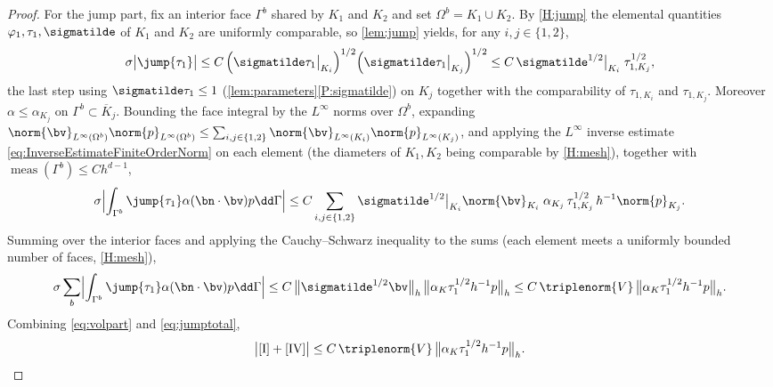 \begin{proof}
For the jump part, fix an interior face $\Gamma^b$ shared by $K_1$ and $K_2$ and set
$\Omega^b=K_1\cup K_2$. By \cref{H:jump} the elemental quantities
$\varphi_1,\tau_1,\sigmatilde$ of $K_1$ and $K_2$ are uniformly comparable, so
\cref{lem:jump} yields, for any $i,j\in\{1,2\}$,
\begin{equation}\label{eq:jumpsplit}
  \sigma\bigl|\jump{\tau_1}\bigr|
  \le C\,\Bigl(\sigmatilde\tau_1\big|_{K_i}\Bigr)^{1/2}
        \Bigl(\sigmatilde\tau_1\big|_{K_j}\Bigr)^{1/2}
  \le C\,\sigmatilde^{1/2}\big|_{K_i}\;\tau_{1,K_j}^{1/2},
\end{equation}
the last step using $\sigmatilde\tau_1\le1$ (\cref{lem:parameters}\ref{P:sigmatilde})
on $K_j$ together with the comparability of $\tau_{1,K_i}$ and $\tau_{1,K_j}$.
Moreover $\alpha\le\alpha_{K_j}$ on $\Gamma^b\subset\overline{K}_j$. Bounding the face
integral by the $L^\infty$ norms over $\Omega^b$, expanding
$\norm{\bv}_{L^\infty(\Omega^b)}\norm{p}_{L^\infty(\Omega^b)}
\le\sum_{i,j\in\{1,2\}}\norm{\bv}_{L^\infty(K_i)}\norm{p}_{L^\infty(K_j)}$, and applying
the $L^\infty$ inverse estimate \eqref{eq:InverseEstimateFiniteOrderNorm} on each element (the diameters of
$K_1,K_2$ being comparable by \cref{H:mesh}), together with
$\operatorname{meas}(\Gamma^b)\le C h^{d-1}$,
\begin{equation}\label{eq:jumppart}
  \sigma\Bigl|\int_{\Gamma^b}\jump{\tau_1}\alpha(\bn\cdot\bv)p\dd\Gamma\Bigr|
  \le C\sum_{i,j\in\{1,2\}}
  \sigmatilde^{1/2}\big|_{K_i}\norm{\bv}_{K_i}\;
  \alpha_{K_j}\,\tau_{1,K_j}^{1/2}\,h^{-1}\norm{p}_{K_j}.
\end{equation}
Summing over the interior faces and applying the Cauchy--Schwarz inequality to the sums
(each element meets a uniformly bounded number of faces, \cref{H:mesh}),
\begin{equation}\label{eq:jumptotal}
  \sigma\sum_{b}\Bigl|\int_{\Gamma^b}\jump{\tau_1}\alpha(\bn\cdot\bv)p
  \dd\Gamma\Bigr|
  \le C\,\bigl\lVert\sigmatilde^{1/2}\bv\bigr\rVert_h\,
  \bigl\lVert\alpha_K\tau_1^{1/2}h^{-1}p\bigr\rVert_h
  \le C\,\triplenorm{V}\,
  \bigl\lVert\alpha_K\tau_1^{1/2}h^{-1}p\bigr\rVert_h .
\end{equation}
Combining \eqref{eq:volpart} and \eqref{eq:jumptotal},
\begin{equation}\label{eq:IIVbound}
  \bigl|\textup{[I]}+\textup{[IV]}\bigr|
  \le C\,\triplenorm{V}\,
  \bigl\lVert\alpha_K\tau_1^{1/2}h^{-1}p\bigr\rVert_h .
\end{equation}


\end{proof}
